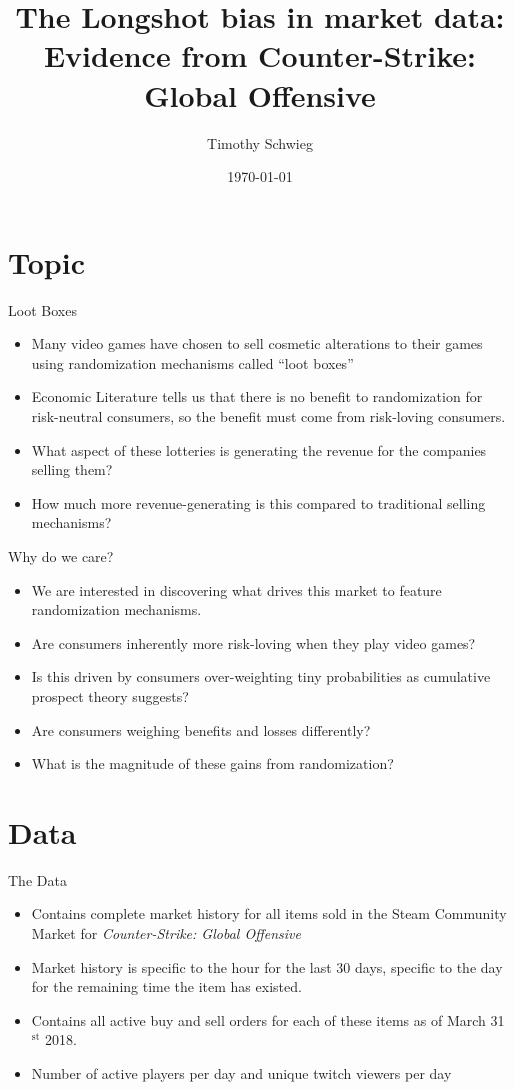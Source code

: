 \documentclass[presentation]{beamer}
\author{Timothy Schwieg}
\date{\today}
\title{The Longshot bias in market data: Evidence from Counter-Strike: Global Offensive}
\begin{document}
\maketitle


\section{Topic}
\label{sec:org7688849}
\begin{frame}[label={sec:org7bd38b2}]{Loot Boxes}
\begin{itemize}
\item Many video games have chosen to sell cosmetic alterations to their
games using randomization mechanisms called ``loot boxes''
\item Economic Literature tells us that there is no benefit to
randomization for risk-neutral consumers, so the benefit must come
from risk-loving consumers.
\item What aspect of these lotteries is generating the revenue for the
companies selling them?
\item How much more revenue-generating is this compared to traditional
selling mechanisms?
\end{itemize}
\end{frame}

\begin{frame}[label={sec:org4e363d3}]{Why do we care?}
\begin{itemize}
\item We are interested in discovering what drives this market to feature
randomization mechanisms.
\item Are consumers inherently more risk-loving when they play video
games?
\item Is this driven by consumers over-weighting tiny probabilities as
cumulative prospect theory suggests?
\item Are consumers weighing benefits and losses differently?
\item What is the magnitude of these gains from randomization?
\end{itemize}
\end{frame}

\section{Data}
\label{sec:orgd2aabb4}
\begin{frame}[label={sec:org1fd3d46}]{The Data}
\begin{itemize}
\item Contains complete market history for all items sold in the Steam
Community Market for \emph{Counter-Strike: Global Offensive}
\item Market history is specific to the hour for the last 30 days,
specific to the day for the remaining time the item has existed.
\item Contains all active buy and sell orders for each of these items as
of March 31\(^{\text{st}}\) 2018.
\item Number of active players per day and unique twitch viewers per day
\end{itemize}
\end{frame}
\end{document}
